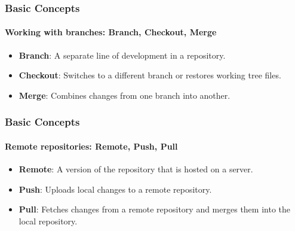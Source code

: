 \documentclass{beamer}
\begin{document}
\begin{frame}\frametitle{Basic Concepts}\framesubtitle{Working with branches: Branch, Checkout, Merge}
\begin{itemize}
	\item<1-> \textbf{Branch}: A separate line of development in a repository.
	\vspace{0.2cm}
	\item<2-> \textbf{Checkout}: Switches to a different branch or	 restores working tree files.
	\vspace{0.2cm}
	\item<3-> \textbf{Merge}: Combines changes from one branch into another.
\end{itemize}
\end{frame}

\begin{frame}\frametitle{Basic Concepts}\framesubtitle{Remote repositories: Remote, Push, Pull}
\begin{itemize}
	\item<1-> \textbf{Remote}: A version of the repository that is hosted on a server.
	\vspace{0.2cm}
	\item<2-> \textbf{Push}: Uploads local changes to a remote repository.
	\vspace{0.2cm}
	\item<3-> \textbf{Pull}: Fetches changes from a remote repository and merges them into the local repository.
\end{itemize}
\end{frame}
\end{document}
